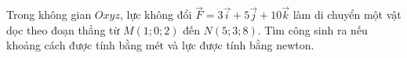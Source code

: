 \begin{bt}%

	Trong không gian $Oxyz$, lực không đổi $\overrightarrow{F}=3\overrightarrow{i}+5\overrightarrow{j}+10\overrightarrow{k}$ làm di chuyển một vật dọc theo đoạn thẳng từ $M\left(1;0;2\right)$ đến $N\left(5;3;8\right)$. Tìm công sinh ra nếu khoảng cách được tính bằng mét và lực được tính bằng newton.	
\end{bt}

